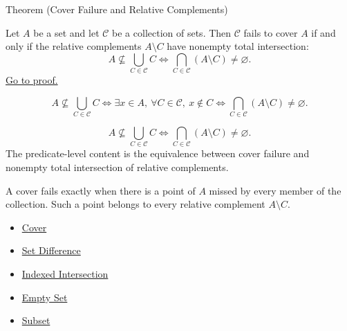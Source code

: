 \begin{theorembox}{Theorem (Cover Failure and Relative Complements)}
\begin{theorem}\label{thm:cover-failure-relative-complements}
Let $A$ be a set and let $\mathcal{C}$ be a collection of sets. Then
$\mathcal{C}$ fails to cover $A$ if and only if the relative complements
$A\setminus C$ have nonempty total intersection:
\[
A\not\subseteq\bigcup_{C\in\mathcal C}C
\iff
\bigcap_{C\in\mathcal{C}}(A\setminus C)\neq\varnothing.
\]
\hyperref[prf:cover-failure-relative-complements]{Go to proof.}
\end{theorem}
\end{theorembox}

\begin{remark*}
\[
A\not\subseteq\bigcup_{C\in\mathcal C}C
\iff
\exists x\in A,\ \forall C\in\mathcal C,\ x\notin C
\iff
\bigcap_{C\in\mathcal C}(A\setminus C)\neq\varnothing.
\]
\end{remark*}

\begin{remark*}
\[
  A\not\subseteq\bigcup_{C\in\mathcal C}C
  \iff
  \bigcap_{C\in\mathcal C}(A\setminus C)\neq\varnothing.
\]
The predicate-level content is the equivalence between cover failure and
nonempty total intersection of relative complements.
\end{remark*}

\begin{remark*}[Interpretation]
A cover fails exactly when there is a point of $A$ missed by every member of
the collection.  Such a point belongs to every relative complement
$A\setminus C$.
\end{remark*}


\begin{dependencies}
\begin{itemize}
  \item \hyperref[def:cover-full]{Cover}
  \item \hyperref[def:set-difference]{Set Difference}
  \item \hyperref[def:indexed-intersection]{Indexed Intersection}
  \item \hyperref[def:empty-set]{Empty Set}
  \item \hyperref[def:subset]{Subset}
\end{itemize}
\end{dependencies}


